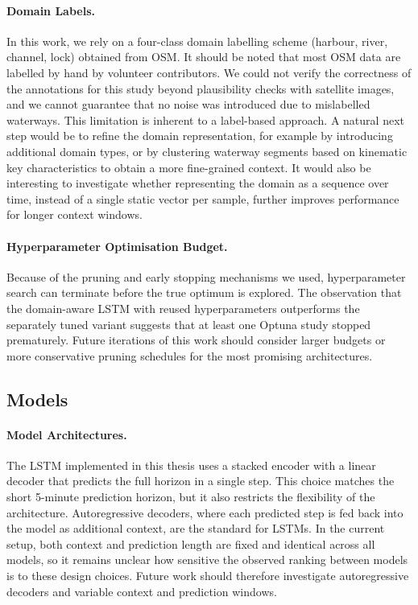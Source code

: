 \paragraph{Domain Labels.}
In this work, we rely on a four-class domain labelling scheme (harbour, river, channel, lock) obtained from \ac{OSM}. %
It should be noted that most \ac{OSM} data are labelled by hand by volunteer contributors. We could not verify the correctness of the annotations for this study beyond plausibility checks with satellite images, and we cannot guarantee that no noise was introduced due to mislabelled waterways. This limitation is inherent to a label-based approach.
A natural next step would be to refine the domain representation, for example by introducing additional domain types, or by clustering waterway segments based on kinematic key characteristics to obtain a more fine-grained context. It would also be interesting to investigate whether representing the domain as a sequence over time, instead of a single static vector per sample, further improves performance for longer context windows.

\paragraph{Hyperparameter Optimisation Budget.}
Because of the pruning and early stopping mechanisms we used, hyperparameter search can terminate before the true optimum is explored. The observation that the domain-aware \ac{LSTM} with reused hyperparameters outperforms the separately tuned variant suggests that at least one Optuna study stopped prematurely. Future iterations of this work should consider larger budgets or more conservative pruning schedules for the most promising architectures.



\subsection*{Models}

\paragraph{Model Architectures.}
The \ac{LSTM} implemented in this thesis uses a stacked encoder with a linear decoder that predicts the full horizon in a single step.
This choice matches the short 5-minute prediction horizon, but it also restricts the flexibility of the architecture.
Autoregressive decoders, where each predicted step is fed back into the model as additional context, are the standard for \acp{LSTM}.
In the current setup, both context and prediction length are fixed and identical across all models, so it remains unclear how sensitive the observed ranking between models is to these design choices.
Future work should therefore investigate autoregressive decoders and variable context and prediction windows.

